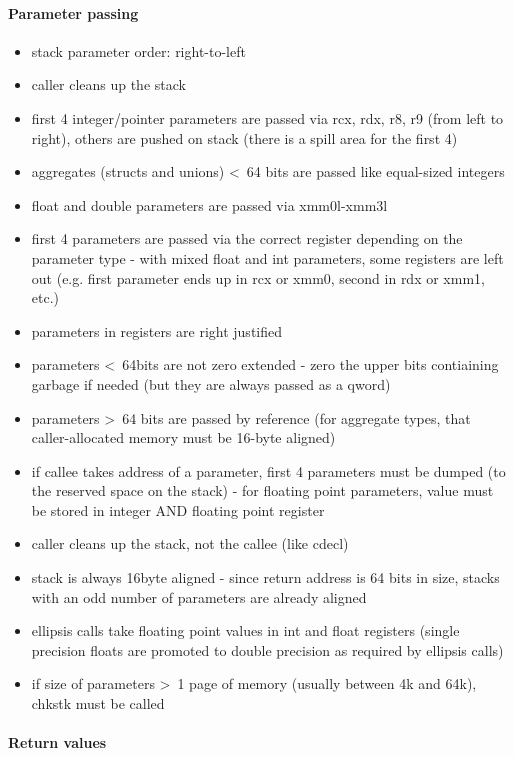 \paragraph{Parameter passing}

\begin{itemize}
\item stack parameter order: right-to-left
\item caller cleans up the stack
\item first 4 integer/pointer parameters are passed via rcx, rdx, r8, r9 (from left to right), others are pushed on stack (there is a
spill area for the first 4)
\item aggregates (structs and unions) \textless\ 64 bits are passed like equal-sized integers
\item float and double parameters are passed via xmm0l-xmm3l
\item first 4 parameters are passed via the correct register depending on the parameter type - with mixed float and int parameters,
some registers are left out (e.g. first parameter ends up in rcx or xmm0, second in rdx or xmm1, etc.)
\item parameters in registers are right justified
\item parameters \textless\ 64bits are not zero extended - zero the upper bits contiaining garbage if needed (but they are always
passed as a qword)
\item parameters \textgreater\ 64 bits are passed by reference (for aggregate types, that caller-allocated memory must be 16-byte aligned)
\item if callee takes address of a parameter, first 4 parameters must be dumped (to the reserved space on the stack) - for
floating point parameters, value must be stored in integer AND floating point register
\item caller cleans up the stack, not the callee (like cdecl)
\item stack is always 16byte aligned - since return address is 64 bits in size, stacks with an odd number of parameters are
already aligned
\item ellipsis calls take floating point values in int and float registers (single precision floats are promoted to double precision as
required by ellipsis calls)
\item if size of parameters \textgreater\ 1 page of memory (usually between 4k and 64k), chkstk must be called
\end{itemize}


\paragraph{Return values}


